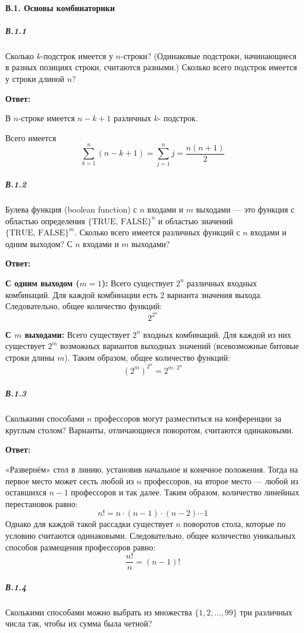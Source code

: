 \paragraph{В.1. Основы комбинаторики}

\subparagraph{В.1.1}
Сколько $k$-подстрок имеется у $n$-строки? (Одинаковые подстроки, начинающиеся в разных позициях строки, 
считаются разными.) Сколько всего подстрок имеется у строки длиной $n$?

\textbf{Ответ:}

В $n$-строке имеется $n-k+1$ различных $k$- подстрок.

Всего имеется $$\sum_{k=1}^{n} (n-k+1) = \sum_{j=1}^{n} j = \frac{n(n+1)}{2}$$

\subparagraph{В.1.2}
Булева функция (boolean function) с $n$ входами и $m$ выходами — это функция с областью определения
$\{\text{TRUE, FALSE}\}^n$ и областью значений $\{\text{TRUE, FALSE}\}^m$.
Сколько всего имеется различных функций с $n$ входами и одним выходом? С $n$ входами и $m$ выходами?

\textbf{Ответ:}

\textbf{С одним выходом ($m=1$):} 
    Всего существует $2^n$ различных входных комбинаций. Для каждой комбинации есть 2 варианта значения выхода. 
    Следовательно, общее количество функций: \[ 2^{2^n} \]

\textbf{С $m$ выходами:} 
    Всего существует $2^n$ входных комбинаций. Для каждой из них существует $2^m$ возможных вариантов выходных значений 
    (всевозможные битовые строки длины $m$). Таким образом, общее количество функций:
    \[ (2^m)^{2^n} = 2^{m \cdot 2^n} \]

\subparagraph{В.1.3}
Сколькими способами $n$ профессоров могут разместиться на конференции за круглым столом? 
Варианты, отличающиеся поворотом, считаются одинаковыми.

\textbf{Ответ:}

«Развернём» стол в линию, установив начальное и конечное положения.
Тогда на первое место может сесть любой из $n$ профессоров, на второе место — любой из оставшихся $n-1$ профессоров и так далее.
Таким образом, количество линейных перестановок равно:
\[
n! = n \cdot (n-1) \cdot (n-2) \cdots 1
\]
Однако для каждой такой рассадки существует $n$ поворотов стола, которые по условию считаются одинаковыми. 
Следовательно, общее количество уникальных способов размещения профессоров равно:
\[
\frac{n!}{n} = (n-1)!
\]

\subparagraph{В.1.4}
Сколькими способами можно выбрать из множества $\{1, 2, \dots, 99\}$ три различных числа так,
чтобы их сумма была четной?

